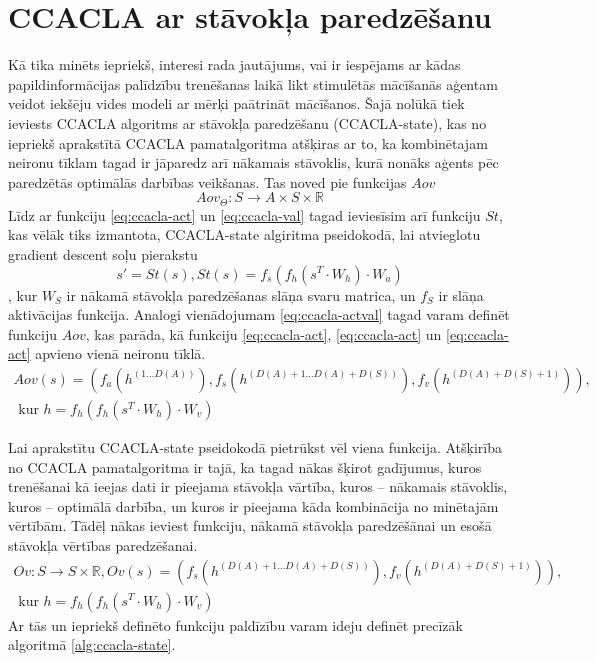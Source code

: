 \documentclass{ludis} %
\begin{document}
\section{CCACLA ar stāvokļa paredzēšanu}
Kā tika minēts iepriekš, interesi rada jautājums, vai ir iespējams ar kādas
papildinformācijas palīdzību trenēšanas laikā likt stimulētās mācīšanās aģentam
veidot iekšēju vides modeli ar mērķi paātrināt mācīšanos. Šajā nolūkā tiek
ieviests CCACLA algoritms ar stāvokļa paredzēšanu (CCACLA-state), kas no iepriekš aprakstītā
CCACLA pamatalgoritma atšķiras ar to, ka kombinētajam neironu tīklam tagad ir
jāparedz arī nākamais stāvoklis, kurā nonāks aģents pēc paredzētās optimālās
darbības veikšanas. Tas noved pie funkcijas $Aov$ 
\begin{equation}
  Aov_\Theta:S \rightarrow A \times S \times \mathbb{R}
\end{equation}
Līdz ar funkciju \ref{eq:ccacla-act} un \ref{eq:ccacla-val} tagad ieviesīsim arī
funkciju $St$, kas vēlāk tiks izmantota, CCACLA-state algiritma pseidokodā, lai
atvieglotu gradient descent soļu pierakstu
\begin{equation}\label{eq:ccacla-obs}
  s' = St(s), St(s) = f_s(f_h(s^T \cdot W_h) \cdot W_a)
\end{equation} 
, kur $W_S$ ir nākamā stāvokļa paredzēšanas slāņa svaru matrica, un $f_S$ ir
slāņa aktivācijas funkcija.
Analogi vienādojumam \ref{eq:ccacla-actval} tagad varam definēt funkciju $Aov$,
kas parāda, kā funkciju \ref{eq:ccacla-act}, \ref{eq:ccacla-act} un
\ref{eq:ccacla-act} apvieno vienā neironu tīklā.
\begin{multline}\label{eq:ccacla-actobsval}
  Aov(s) = \left(f_a(h^{(1 \ldots D(A))}),
                 f_s(h^{(D(A) + 1 \ldots D(A) + D(S))}),
                 f_v(h^{(D(A) + D(S) + 1)})\right), \\
  \text{ kur } h = f_h\left(f_h(s^T \cdot W_h) \cdot W_v\right)
\end{multline}

Lai aprakstītu CCACLA-state pseidokodā pietrūkst vēl viena funkcija. Atšķirība no
CCACLA pamatalgoritma ir tajā, ka tagad nākas šķirot gadījumus, kuros
trenēšanai kā ieejas dati ir pieejama stāvokļa vārtība, kuros -- nākamais
stāvoklis, kuros -- optimālā darbība, un kuros ir pieejama kāda kombinācija no
minētajām vērtībām. Tādēļ nākas ieviest funkciju, nākamā stāvokļa paredzēšānai
un esošā stāvokļa vērtības paredzēšanai.
\begin{multline}\label{eq:ccacla-obsval}
  Ov: S \rightarrow S \times \mathbb{R},
        Ov(s) = \left(f_s(h^{(D(A) + 1 \ldots D(A) + D(S))}),
                 f_v(h^{(D(A) + D(S) + 1)})\right), \\
  \text{ kur } h = f_h\left(f_h(s^T \cdot W_h) \cdot W_v\right)
\end{multline}
Ar tās un iepriekš definēto funkciju paldīzību varam ideju definēt precīzāk
algoritmā \ref{alg:ccacla-state}.
\end{document}
